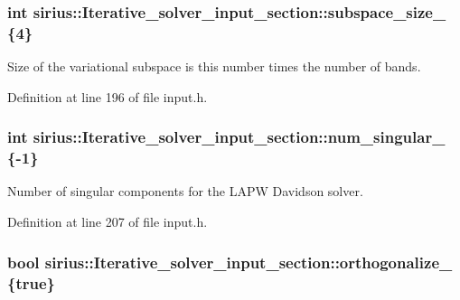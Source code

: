 \subsubsection[{subspace\+\_\+size\+\_\+}]{\setlength{\rightskip}{0pt plus 5cm}int sirius\+::\+Iterative\+\_\+solver\+\_\+input\+\_\+section\+::subspace\+\_\+size\+\_\+ \{4\}}\label{structsirius_1_1_iterative__solver__input__section_ab0d3c4fac532bbf39de7d1df8158895e}


Size of the variational subspace is this number times the number of bands. 



Definition at line 196 of file input.\+h.

\hypertarget{structsirius_1_1_iterative__solver__input__section_a93683d095b2fe257915b150fe540015e}{}
\subsubsection[{num\+\_\+singular\+\_\+}]{\setlength{\rightskip}{0pt plus 5cm}int sirius\+::\+Iterative\+\_\+solver\+\_\+input\+\_\+section\+::num\+\_\+singular\+\_\+ \{-\/1\}}\label{structsirius_1_1_iterative__solver__input__section_a93683d095b2fe257915b150fe540015e}


Number of singular components for the L\+A\+P\+W Davidson solver. 



Definition at line 207 of file input.\+h.

\hypertarget{structsirius_1_1_iterative__solver__input__section_a8ac7b4092ce88a07adea0f746ee8e72d}{}
\subsubsection[{orthogonalize\+\_\+}]{\setlength{\rightskip}{0pt plus 5cm}bool sirius\+::\+Iterative\+\_\+solver\+\_\+input\+\_\+section\+::orthogonalize\+\_\+ \{true\}}\label{structsirius_1_1_iterative__solver__input__section_a8ac7b4092ce88a07adea0f746ee8e72d}


